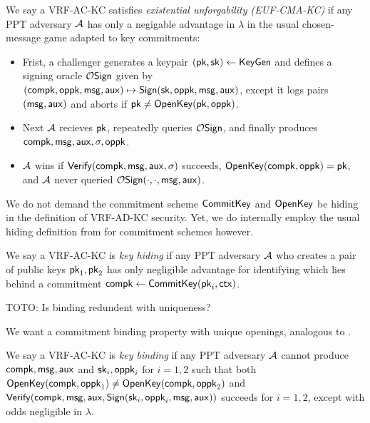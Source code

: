 \begin{definition}
We say a VRF-AC-KC satisfies {\em existential unforgability (EUF-CMA-KC)} if
any PPT adversary $\mathcal{A}$ has only a negigable advantage in $\lambda$
in the usual chosen-message game adapted to key commitments:
\begin{itemize}
 \item Frist, a challenger
  generates a keypair $(\mathsf{pk},\mathsf{sk}) \leftarrow {\ensuremath{\mathsf{KeyGen}}}$ and
  defines a signing oracle $\mathcal{O}\mathsf{Sign}$ given by
  $(\mathsf{compk},\mathsf{oppk},\mathsf{msg},\mathsf{aux}) \mapsto {\ensuremath{\mathsf{Sign}}}(\mathsf{sk},\mathsf{oppk},\mathsf{msg},\mathsf{aux})$,
   except it logs pairs $(\mathsf{msg},\mathsf{aux})$ and aborts if $\mathsf{pk} \ne {\ensuremath{\mathsf{OpenKey}}}(\mathsf{pk},\mathsf{oppk})$.
 \item Next $\mathcal{A}$ recieves $\mathsf{pk}$, repeatedly queries $\mathcal{O}\mathsf{Sign}$,
  and finally produces $\mathsf{compk},\mathsf{msg},\mathsf{aux},\sigma,\mathsf{oppk}$.
 \item $\mathcal{A}$ wins if ${\mathsf{Verify}}(\mathsf{compk},\mathsf{msg},\mathsf{aux},\sigma)$ succeeds,
  ${\mathsf{OpenKey}}(\mathsf{compk},\mathsf{oppk}) = \mathsf{pk}$, and
   $\mathcal{A}$ never queried $\mathcal{O}\mathsf{Sign}(\cdot,\cdot,\mathsf{msg},\mathsf{aux})$.
\end{itemize}
\end{definition}

We do not demand the commitment scheme ${\mathsf{CommitKey}}$ and ${\mathsf{OpenKey}}$
be hiding in the definition of VRF-AD-KC security.
Yet, we do internally employ the usual hiding definition from
\cite[pp.8]{cryptoeprint:2019:1185} for commitment schemes however.

\begin{definition}
We say a VRF-AC-KC is {\em key hiding} if any PPT adversary $\mathcal{A}$
who creates a pair of public keys $\mathsf{pk}_1,\mathsf{pk}_2$
has only negligible advantage for identifying which lies behind a commitment
 $\mathsf{compk} \leftarrow {\ensuremath{\mathsf{CommitKey}}}(\mathsf{pk}_i,\mathsf{ctx})$.
\end{definition}

TOTO: Is binding redundent with uniqueness?

We want a commitment binding property with unique openings,
analogous to \cite[pp.9]{cryptoeprint:2019:1185}.

\begin{definition}
We say a VRF-AC-KC is {\em key binding} if any PPT adversary $\mathcal{A}$
cannot produce $\mathsf{compk},\mathsf{msg},\mathsf{aux}$ and $\mathsf{sk}_i,\mathsf{oppk}_i$ for $i=1,2$
such that both
 ${\mathsf{OpenKey}}(\mathsf{compk},\mathsf{oppk}_1) \ne {\ensuremath{\mathsf{OpenKey}}}(\mathsf{compk},\mathsf{oppk}_2)$ and
 ${\mathsf{Verify}}(\mathsf{compk},\mathsf{msg},\mathsf{aux},{\mathsf{Sign}}(\mathsf{sk}_i,\mathsf{oppk}_i,\mathsf{msg},\mathsf{aux}))$ succeeds for $i=1,2$,
except with odds negligible in $\lambda$.
\end{definition}

